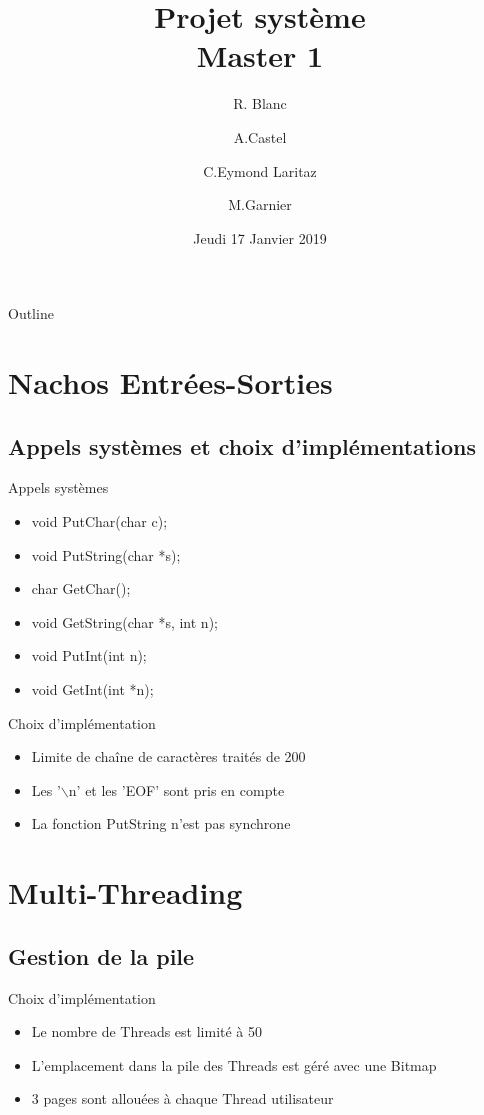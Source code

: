 \documentclass{beamer}
\title{Projet système\\Master 1}
\author{R. Blanc \and A.Castel \and C.Eymond Laritaz \and M.Garnier}
\institute[Université Grenoble Alpes] %
{
  UFR IM²AG\\
  Université Grenoble Alpes
}
\date{Jeudi 17 Janvier 2019}
\begin{document}
\begin{frame}
  \titlepage
\end{frame}

\begin{frame}{Outline}
  \tableofcontents%
\end{frame}


\section{Nachos Entrées-Sorties}
\subsection{Appels systèmes et choix d'implémentations }
\begin{frame}
	\begin{block}{Appels systèmes}
		\begin{itemize}
			\item void PutChar(char c);
			\item void PutString(char *s);
			\item char GetChar();
			\item void GetString(char *s, int n);
			\item void PutInt(int n);
			\item void GetInt(int *n);
		\end{itemize}
	\end{block}
	\begin{block}{Choix d’implémentation}
		\begin{itemize}
			\item Limite de chaîne de caractères traités de 200
			\item Les '$\backslash$n' et les 'EOF' sont pris en compte
			\item La fonction PutString n'est pas synchrone 
		\end{itemize}		
	\end{block}
\end{frame}

\section{Multi-Threading}
\subsection{Gestion de la pile}
\begin{frame}
	\begin{block}{Choix d’implémentation }
		\begin{itemize}
			\item Le nombre de Threads est limité à 50 
			\item L'emplacement dans la pile des Threads est géré avec une Bitmap
			\item 3 pages sont allouées à chaque Thread utilisateur 
		\end{itemize}
	\end{block}
\end{frame}
\end{document}
